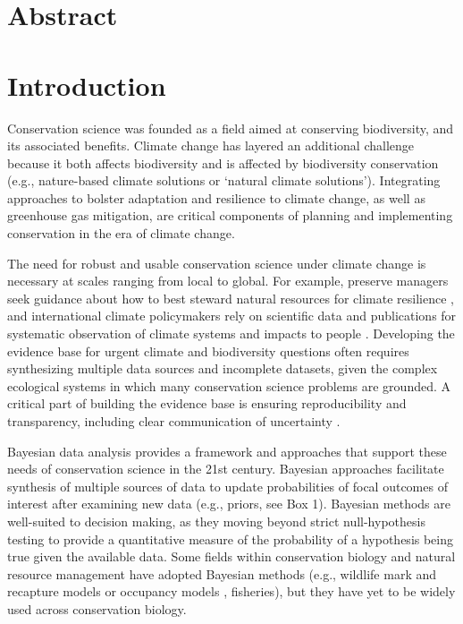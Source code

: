 \documentclass{article}
\begin{document}
\section*{Abstract} 


\newpage
\section* {Introduction}

Conservation science was founded as a field aimed at conserving biodiversity, and its associated benefits. Climate change has layered an additional challenge because it both affects biodiversity and is affected by biodiversity conservation (e.g., nature-based climate solutions or `natural climate solutions'). %
Integrating approaches to bolster adaptation and resilience to climate change, as well as greenhouse gas mitigation, are critical components of planning and implementing conservation in the era of climate change.

\par The need for robust and usable conservation science under climate change is necessary at scales ranging from local to global. For example, preserve managers seek guidance about how to best steward natural resources for climate resilience \citep{Nadeau2015}, and  international climate policymakers rely on scientific data and publications for systematic observation of climate systems and impacts to people \cite{ipcc2007}. Developing the evidence base for urgent climate and biodiversity questions often requires synthesizing multiple data sources and incomplete datasets, given the complex ecological systems in which many conservation science problems are grounded. A critical part of building the evidence base is ensuring reproducibility and transparency, including clear communication of uncertainty \citep{ellis2024principles,ipcc2007}. 

\par Bayesian data analysis provides a framework and approaches that support these needs of conservation science in the 21st century. Bayesian approaches facilitate synthesis of multiple sources of data to update probabilities of focal outcomes of interest after examining new data (e.g., priors, see Box 1). Bayesian methods are well-suited to decision making, as they moving beyond strict null-hypothesis testing to provide a quantitative measure of the probability of a hypothesis being true given the available data. Some fields within conservation biology and natural resource management have adopted Bayesian methods (e.g., wildlife mark and recapture models or occupancy models \citep{Kery2011}, fisheries\citep{Doll2018}), but they have yet to be widely used across conservation biology.
\end{document}
